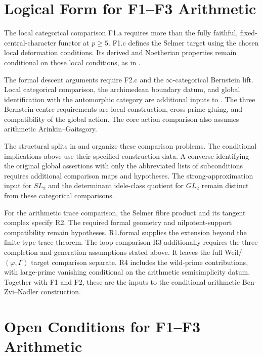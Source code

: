 \section{Logical Form for F1--F3 Arithmetic}
\label{v4-arith:w3-comparison-A:summary}

The local categorical comparison F1.a requires more than the fully
faithful, fixed-central-character functor at \(p\geq5\).
F1.c defines the Selmer target using the chosen local deformation
conditions. Its derived and Noetherian properties remain conditional
on those local conditions, as in .

The formal descent arguments require F2.c and the
\(\infty\)-categorical Bernstein lift.
Local categorical comparison, the archimedean boundary datum,
and global identification with the automorphic category are
additional inputs to
.
The three Bernstein-centre requirements are local construction,
cross-prime gluing, and compatibility of the global action.
The core action comparison also assumes arithmetic
Arinkin--Gaitsgory.

The structural splits in
 and
organize these comparison problems.
The conditional implications above use their specified construction
data. A converse identifying the original global assertions with
only the abbreviated lists of subconditions requires additional
comparison maps and hypotheses.
The strong-approximation input for \(SL_2\) and the determinant
idele-class quotient for \(GL_2\) remain distinct from these
categorical comparisons.

For the arithmetic trace comparison, the Selmer fibre product and
its tangent complex specify R2. The required formal geometry and
nilpotent-support compatibility remain hypotheses.
R1.formal supplies the extension beyond the finite-type trace theorem.
The loop comparison R3 additionally requires the three completion
and generation assumptions stated above. It leaves the full
Weil/\((\varphi,\Gamma)\) target comparison separate.
R4 includes the wild-prime contributions, with large-prime vanishing
conditional on the arithmetic semisimplicity datum.
Together with F1 and F2, these are the inputs to the conditional
arithmetic Ben-Zvi--Nadler construction.

\section{Open Conditions for F1--F3 Arithmetic}
\label{v4-arith:w3-comparison-A:overall}

